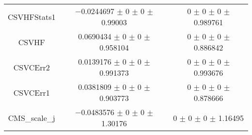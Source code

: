 \begin{table}
\begin{tabular}{ccc}
CSVHFStats1 & \num{-0.0244697} $\pm$ \num{0} $\pm$ \num{0} $\pm$ \num{0.99003} & \num{0} $\pm$ \num{0} $\pm$ \num{0} $\pm$ \num{0.989761}\\
CSVHF & \num{0.0690434} $\pm$ \num{0} $\pm$ \num{0} $\pm$ \num{0.958104} & \num{0} $\pm$ \num{0} $\pm$ \num{0} $\pm$ \num{0.886842}\\
CSVCErr2 & \num{0.0139176} $\pm$ \num{0} $\pm$ \num{0} $\pm$ \num{0.991373} & \num{0} $\pm$ \num{0} $\pm$ \num{0} $\pm$ \num{0.993676}\\
CSVCErr1 & \num{0.0381809} $\pm$ \num{0} $\pm$ \num{0} $\pm$ \num{0.903773} & \num{0} $\pm$ \num{0} $\pm$ \num{0} $\pm$ \num{0.878666}\\
CMS\_scale\_j & \num{-0.0483576} $\pm$ \num{0} $\pm$ \num{0} $\pm$ \num{1.30176} & \num{0} $\pm$ \num{0} $\pm$ \num{0} $\pm$ \num{1.16495}\\
\bottomrule
\end{tabular}
\end{table}